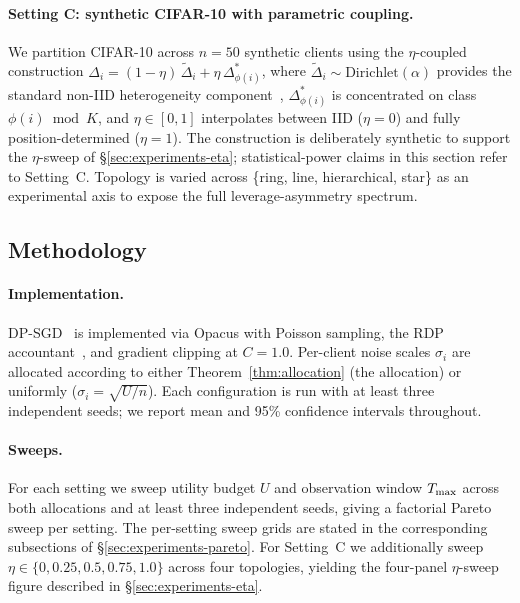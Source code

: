 \paragraph{Setting C: synthetic CIFAR-10 with parametric coupling.}
We partition CIFAR-10 across $n=50$ synthetic clients using the
$\eta$-coupled construction
\(\Delta_i = (1-\eta)\,\tilde{\Delta}_i + \eta\,\Delta^*_{\phi(i)}\),
where $\tilde{\Delta}_i \sim \mathrm{Dirichlet}(\alpha)$ provides
the standard non-IID heterogeneity component~\cite{hsu2019dirichlet},
$\Delta^*_{\phi(i)}$ is concentrated on class
\(\phi(i)\bmod K\), and $\eta \in [0,1]$ interpolates between IID
($\eta=0$) and fully position-determined ($\eta=1$). The construction
is deliberately synthetic to support the
$\eta$-sweep of \S\ref{sec:experiments-eta}; statistical-power claims
in this section refer to Setting~C. Topology is varied across
\{ring, line, hierarchical, star\} as an experimental axis to expose the
full leverage-asymmetry spectrum.

\subsection{Methodology}
\label{sec:experiments-methodology}

\paragraph{Implementation.}
DP-SGD~\cite{abadi2016dpsgd} is implemented via Opacus with
Poisson sampling, the RDP accountant~\cite{mironov2017rdp}, and
gradient clipping at $C=1.0$. Per-client noise scales $\sigma_i$ are
allocated according to either Theorem~\ref{thm:allocation} (the
\Fulcrum allocation) or uniformly ($\sigma_i=\sqrt{U/n}$). Each
configuration is run with at least three independent seeds; we report
mean and 95\% confidence intervals throughout.

\paragraph{Sweeps.}
For each setting we sweep utility budget $U$ and observation window
$T_{\max}$ across both allocations and at least three independent seeds,
giving a factorial Pareto sweep per setting. The per-setting sweep
grids are stated in the corresponding subsections of
\S\ref{sec:experiments-pareto}. For Setting~C we additionally sweep
$\eta \in \{0, 0.25, 0.5, 0.75, 1.0\}$ across four topologies, yielding
the four-panel $\eta$-sweep figure described in
\S\ref{sec:experiments-eta}.


